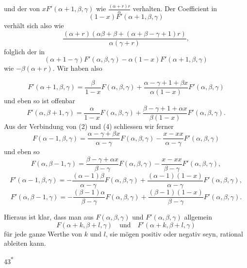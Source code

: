 \noindent und der von $xF'(\alpha+1,\beta,\gamma)$ wie $\frac{(\alpha+r)r}{\alpha}$ verhalten. Der Coefficient in
\[(1-x)F'(\alpha+1,\beta,\gamma)\]
\noindent verhält sich also wie
\[\frac{(\alpha+r)(\alpha\beta+\beta+(\alpha+\beta-\gamma+1)r)}{\alpha(\gamma+r)},\]
\noindent folglich der in
\[(\alpha+1-\gamma)F'(\alpha,\beta,\gamma)-\alpha(1-x)F'(\alpha+1,\beta,\gamma)\]
\noindent wie $-\beta(\alpha+r)$. Wir haben also
\par\smallskip\noindent{\small[S. 37]}\par
\begin{equation}
F'(\alpha+1,\beta,\gamma)=\frac{\beta}{1-x}F(\alpha,\beta,\gamma)+\frac{\alpha-\gamma+1+\beta x}{\alpha(1-x)}F'(\alpha,\beta,\gamma)\tag*{(4)}
\end{equation}
\noindent und eben so ist offenbar
\begin{equation}
F'(\alpha,\beta+1,\gamma)=\frac{\alpha}{1-x}F(\alpha,\beta,\gamma)+\frac{\beta-\gamma+1+\alpha x}{\beta(1-x)}F'(\alpha,\beta,\gamma).\tag*{(5)}
\end{equation}
\noindent Aus der Verbindung von (2) und (4) schliessen wir ferner
\begin{equation}
F(\alpha-1,\beta,\gamma)=\frac{\alpha-\gamma+\beta x}{\alpha-\gamma}F(\alpha,\beta,\gamma)-\frac{x-xx}{\alpha-\gamma}F'(\alpha,\beta,\gamma)\tag*{(6)}
\end{equation}
\noindent und eben so
\begin{equation}
F(\alpha,\beta-1,\gamma)=\frac{\beta-\gamma+\alpha x}{\beta-\gamma}F(\alpha,\beta,\gamma)-\frac{x-xx}{\beta-\gamma}F'(\alpha,\beta,\gamma),\tag*{(7)}
\end{equation}
\begin{equation}
F'(\alpha-1,\beta,\gamma)=-\frac{(\alpha-1)\beta}{\alpha-\gamma}F(\alpha,\beta,\gamma)+\frac{(\alpha-1)(1-x)}{\alpha-\gamma}F'(\alpha,\beta,\gamma),\tag*{(8)}
\end{equation}
\begin{equation}
F'(\alpha,\beta-1,\gamma)=-\frac{(\beta-1)\alpha}{\beta-\gamma}F(\alpha,\beta,\gamma)+\frac{(\beta-1)(1-x)}{\beta-\gamma}F'(\alpha,\beta,\gamma).\tag*{(9)}
\end{equation}
\par\indent Hieraus ist klar, dass man aus $F(\alpha,\beta,\gamma)$ und $F'(\alpha,\beta,\gamma)$ allgemein
\[F(\alpha+k,\beta+l,\gamma)\quad\text{und}\quad F'(\alpha+k,\beta+l,\gamma)\]
\noindent für jede ganze Werthe von $k$ und $l$, sie mögen positiv oder negativ seyn, rational ableiten kann.
\par\bigskip\noindent\hfill 43\textsuperscript{*}
\clearpage
\endgroup
